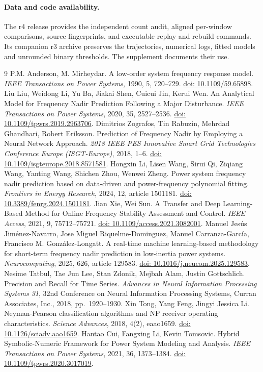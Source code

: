 \documentclass[10pt]{article}
\begin{document}
\paragraph{Data and code availability.}
The r4 release provides the independent count audit, aligned per-window comparisons, source fingerprints, and executable replay and rebuild commands. Its companion r3 archive preserves the trajectories, numerical logs, fitted models and unrounded binary thresholds. The supplement documents their use.
\footnotesize\begin{thebibliography}{9}\setlength{\itemsep}{1pt}
 P.M. Anderson, M. Mirheydar. A low-order system frequency response model. \emph{IEEE Transactions on Power Systems}, 1990, 5, 720--729. \href{https://doi.org/10.1109/59.65898}{doi: 10.1109/59.65898}.
 Liu Liu, Weidong Li, Yu Ba, Jiakai Shen, Cuicui Jin, Kerui Wen. An Analytical Model for Frequency Nadir Prediction Following a Major Disturbance. \emph{IEEE Transactions on Power Systems}, 2020, 35, 2527--2536. \href{https://doi.org/10.1109/tpwrs.2019.2963706}{doi: 10.1109/tpwrs.2019.2963706}.
 Dimitrios Zografos, Tin Rabuzin, Mehrdad Ghandhari, Robert Eriksson. Prediction of Frequency Nadir by Employing a Neural Network Approach. \emph{2018 IEEE PES Innovative Smart Grid Technologies Conference Europe (ISGT-Europe)}, 2018, 1--6. \href{https://doi.org/10.1109/isgteurope.2018.8571581}{doi: 10.1109/isgteurope.2018.8571581}.
 Hongxin Li, Lisen Wang, Sirui Qi, Ziqiang Wang, Yanting Wang, Shichen Zhou, Wenwei Zheng. Power system frequency nadir prediction based on data-driven and power-frequency polynomial fitting. \emph{Frontiers in Energy Research}, 2024, 12, article 1501181. \href{https://doi.org/10.3389/fenrg.2024.1501181}{doi: 10.3389/fenrg.2024.1501181}.
 Jian Xie, Wei Sun. A Transfer and Deep Learning-Based Method for Online Frequency Stability Assessment and Control. \emph{IEEE Access}, 2021, 9, 75712--75721. \href{https://doi.org/10.1109/access.2021.3082001}{doi: 10.1109/access.2021.3082001}.
 Manuel Jesús Jiménez-Navarro, Jose Miguel Riquelme-Dominguez, Manuel Carranza-García, Francisco M. González-Longatt. A real-time machine learning-based methodology for short-term frequency nadir prediction in low-inertia power systems. \emph{Neurocomputing}, 2025, 626, article 129583. \href{https://doi.org/10.1016/j.neucom.2025.129583}{doi: 10.1016/j.neucom.2025.129583}.
 Nesime Tatbul, Tae Jun Lee, Stan Zdonik, Mejbah Alam, Justin Gottschlich. Precision and Recall for Time Series. \emph{Advances in Neural Information Processing Systems 31}, 32nd Conference on Neural Information Processing Systems, Curran Associates, Inc., 2018, pp.~1920--1930.
 Xin Tong, Yang Feng, Jingyi Jessica Li. Neyman-Pearson classification algorithms and NP receiver operating characteristics. \emph{Science Advances}, 2018, 4(2), eaao1659. \href{https://doi.org/10.1126/sciadv.aao1659}{doi: 10.1126/sciadv.aao1659}.
 Hantao Cui, Fangxing Li, Kevin Tomsovic. Hybrid Symbolic-Numeric Framework for Power System Modeling and Analysis. \emph{IEEE Transactions on Power Systems}, 2021, 36, 1373--1384. \href{https://doi.org/10.1109/tpwrs.2020.3017019}{doi: 10.1109/tpwrs.2020.3017019}.
\end{thebibliography}
\end{document}
